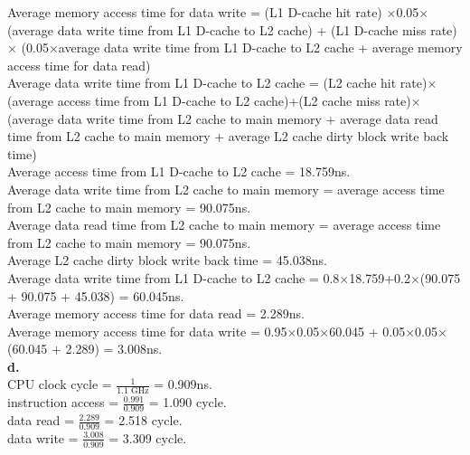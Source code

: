 \documentclass{article}
\begin{document}
\indent Average memory access time for data write = 
(L1 D-cache hit rate) $\times$0.05$\times$(average data write time from L1 D-cache to L2 cache) +
(L1 D-cache miss rate) $\times$ (0.05$\times$average data write time from L1 D-cache to L2 cache + average memory access time for data read)\\

\indent Average data write time from L1 D-cache to L2 cache = (L2 cache hit rate)$\times$(average access time from L1 D-cache to L2 cache)+(L2 cache miss rate)$\times$(average data write time from L2 cache to main memory + average data read time from L2 cache to main memory + average L2 cache dirty block write back time)\\

\indent Average access time from L1 D-cache to L2 cache = 18.759ns.\\

\indent Average data write time from L2 cache to main memory = average access time from L2 cache to main memory = 90.075ns.\\

\indent Average data read time from L2 cache to main memory = average access time from L2 cache to main memory = 90.075ns.\\

\indent Average L2 cache dirty block write back time = 45.038ns.\\

\indent Average data write time from L1 D-cache to L2 cache = 0.8$\times$18.759+0.2$\times$(90.075 + 90.075 + 45.038) = 60.045ns.\\

\indent Average memory access time for data read = 2.289ns.\\

\indent Average memory access time for data write = 0.95$\times$0.05$\times$60.045 + 0.05$\times$0.05$\times$(60.045 + 2.289) = 3.008ns.\\

\noindent\textbf{d.}\\
\indent CPU clock cycle = $\frac{1}{\text{1.1 GHz}}$ = 0.909ns.\\

\indent instruction access = $\frac{0.991}{\text{0.909}}$ = 1.090 cycle.\\

\indent data read = $\frac{2.289}{\text{0.909}}$ = 2.518 cycle.\\

\indent data write = $\frac{3.008}{\text{0.909}}$ = 3.309 cycle.\\
\end{document}
